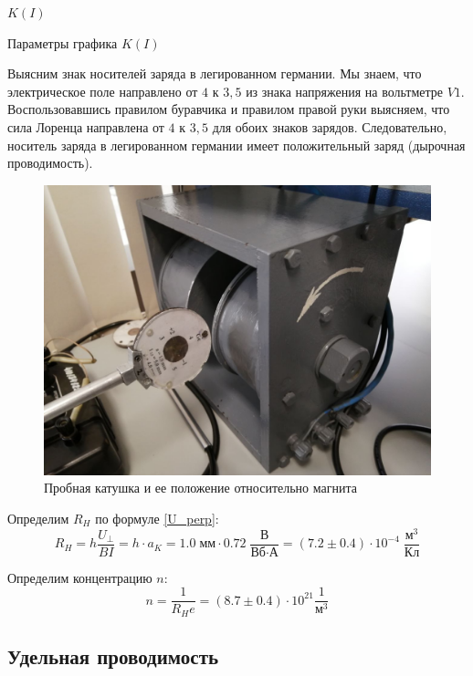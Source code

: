 \documentclass[12pt,a4paper]{article}
\begin{document}
	\begin{table}[h]
		\caption{$K(I)$}
		
	\end{table}
	
	\begin{table}[h]
		\caption{Параметры графика $K(I)$}
		
	\end{table}

	Выясним знак носителей заряда в легированном германии. Мы знаем, что электрическое поле направлено от $4$ к $3,5$ из знака напряжения на вольтметре $V1$. Воспользовавшись правилом буравчика и правилом правой руки выясняем, что сила Лоренца направлена от $4$ к $3,5$ для обоих знаков зарядов. Следовательно, носитель заряда в легированном германии имеет положительный заряд (дырочная проводимость).
	
	\begin{figure}[H]
		\includegraphics[scale = 0.25]{res/probe_coil.jpg}
		\caption{Пробная катушка и ее положение относительно магнита}
	\end{figure}
	
	Определим $R_H$ по формуле \eqref{U_perp}:
	$$ R_H = h \frac{U_\perp}{BI} = h \cdot a_K = 1.0 \; \text{мм} \cdot 0.72 \; \frac{\text{В}}{\text{Вб} \cdot \text{А}} = (7.2 \pm 0.4) \cdot 10^{-4} \; \frac{\text{м}^3}{\text{Кл}} $$
	
	Определим концентрацию $n$:
	$$ n = \frac{1}{R_H e} = (8.7 \pm 0.4) \cdot 10^{21} \frac{1}{\text{м}^3} $$
	
	\subsection*{Удельная проводимость}
	
\end{document}
